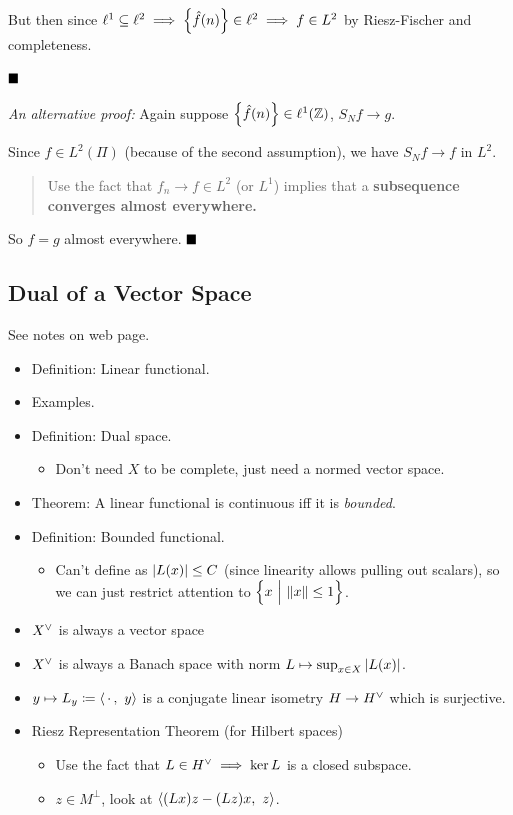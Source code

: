 But then since
\(\ell^1 \subseteq \ell^2 \implies \left\{{\hat{f}(n)}\right\} \in \ell^2 \implies f\in L^2\)
by Riesz-Fischer and completeness.

\(\qed\)

\emph{An alternative proof: } Again suppose
\(\left\{{\hat{f}(n)}\right\} \in \ell^1({\mathbb{Z}})\), \(S_Nf \to g\).

Since \(f\in L^2(\Pi)\) (because of the second assumption), we have
\(S_Nf \to f\) in \(L^2\).

\begin{quote}
Use the fact that \(f_n \to f \in L^2\) (or \(L^1\)) implies that a
\textbf{subsequence converges almost everywhere.}
\end{quote}

So \(f=g\) almost everywhere. \(\qed\)

\hypertarget{dual-of-a-vector-space}{%
\subsection{Dual of a Vector Space}\label{dual-of-a-vector-space}}

See notes on web page.

\begin{itemize}
\item
  Definition: Linear functional.
\item
  Examples.
\item
  Definition: Dual space.

  \begin{itemize}
  \tightlist
  \item
    Don't need \(X\) to be complete, just need a normed vector space.
  \end{itemize}
\item
  Theorem: A linear functional is continuous iff it is \emph{bounded}.
\item
  Definition: Bounded functional.

  \begin{itemize}
  \tightlist
  \item
    Can't define as \({\left\lvert {L(x)} \right\rvert} \leq C\) (since linearity allows
    pulling out scalars), so we can just restrict attention to
    \(\left\{{x{~\mathrel{\Big|}~} {\left\lVert {x} \right\rVert} \leq 1}\right\}\).
  \end{itemize}
\item
  \(X^\vee\) is always a vector space
\item
  \(X^\vee\) is always a Banach space with norm
  \(L \mapsto \sup_{x\in X} {\left\lvert {L(x)} \right\rvert}\).
\item
  \(y \mapsto L_y \coloneqq {\left\langle {{\,\cdot\,}},~{y} \right\rangle}\) is a conjugate linear
  isometry \(H \to H^\vee\) which is surjective.
\item
  Riesz Representation Theorem (for Hilbert spaces)

  \begin{itemize}
  \tightlist
  \item
    Use the fact that \(L\in H^\vee \implies \ker L\) is a closed
    subspace.
  \item
    \(z\in M^\perp\), look at \({\left\langle { (Lx)z - (Lz)x },~{z} \right\rangle}\).
  \end{itemize}
\end{itemize}

